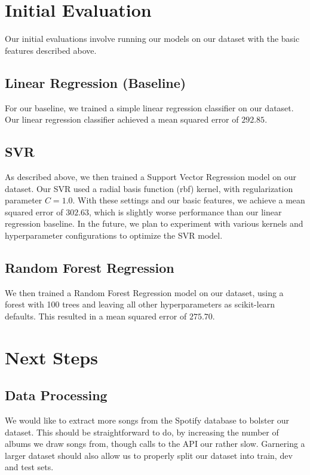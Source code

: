 \documentclass[journal]{IEEEtran}
\begin{document}
\section{Initial Evaluation}

Our initial evaluations involve running our models on our dataset with the basic features described above.

\subsection{Linear Regression (Baseline)}
For our baseline, we trained a simple linear regression classifier on our dataset. Our linear regression classifier achieved a mean squared error of $292.85$.

\subsection{SVR}
As described above, we then trained a Support Vector Regression model on our dataset. Our SVR used a radial basis function (rbf) kernel, with regularization parameter $C = 1.0$. With these settings and our basic features, we achieve a mean squared error of $302.63$, which is slightly worse performance than our linear regression baseline. In the future, we plan to experiment with various kernels and hyperparameter configurations to optimize the SVR model.

\subsection{Random Forest Regression}
We then trained a Random Forest Regression model on our dataset, using a forest with 100 trees and leaving all other hyperparameters as scikit-learn defaults. This resulted in a mean squared error of $275.70$. 


\section{Next Steps}

\subsection{Data Processing}
We would like to extract more songs from the Spotify database to bolster our dataset. This should be straightforward to do, by increasing the number of albums we draw songs from, though calls to the API our rather slow. Garnering a larger dataset should also allow us to properly split our dataset into train, dev and test sets.
\end{document}
